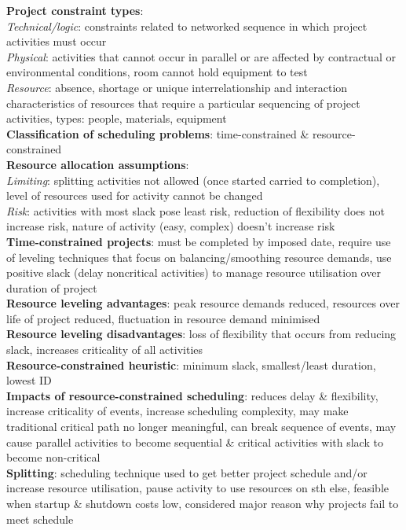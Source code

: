 \documentclass[a4paper]{article}
\begin{document}
\begin{multicols}{3}
        \textbf{Project constraint types}:\\
        \textit{Technical/logic}: constraints related to networked sequence in which project activities must occur\\
        \textit{Physical}: activities that cannot occur in parallel or are affected by contractual or environmental conditions, room cannot hold equipment to test\\
        \textit{Resource}: absence, shortage or unique interrelationship and interaction characteristics of resources that require a particular sequencing of project activities, types: people, materials, equipment\\
        \textbf{Classification of scheduling problems}: time-constrained \& resource-constrained\\
        \textbf{Resource allocation assumptions}:\\
        \textit{Limiting}: splitting activities not allowed (once started carried to completion), level of resources used for activity cannot be changed\\
        \textit{Risk}: activities with most slack pose least risk, reduction of flexibility does not increase risk, nature of activity (easy, complex) doesn't increase risk\\
        \textbf{Time-constrained projects}: must be completed by imposed date, require use of leveling techniques that focus on balancing/smoothing resource demands, use positive slack (delay noncritical activities) to manage resource utilisation over duration of project\\
        \textbf{Resource leveling advantages}: peak resource demands reduced, resources over life of project reduced, fluctuation in resource demand minimised\\
        \textbf{Resource leveling disadvantages}: loss of flexibility that occurs from reducing slack, increases criticality of all activities\\
        \textbf{Resource-constrained heuristic}: minimum slack, smallest/least duration, lowest ID\\
        \textbf{Impacts of resource-constrained scheduling}: reduces delay \& flexibility, increase criticality of events, increase scheduling complexity, may make traditional critical path no longer meaningful, can break sequence of events, may cause parallel activities to become sequential \& critical activities with slack to become non-critical\\
        \textbf{Splitting}: scheduling technique used to get better project schedule and/or increase resource utilisation, pause activity to use resources on sth else, feasible when startup \& shutdown costs low, considered major reason why projects fail to meet schedule\\

\end{multicols}
\end{document}
